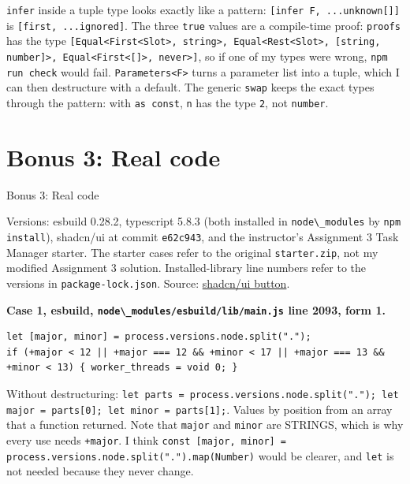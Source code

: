 \passthrough{\lstinline!infer!} inside a tuple type looks exactly like a pattern: \passthrough{\lstinline![infer F, ...unknown[]]!} is \passthrough{\lstinline![first, ...ignored]!}. The three \passthrough{\lstinline!true!} values
are a compile-time proof: \passthrough{\lstinline!proofs!} has the type \passthrough{\lstinline![Equal<First<Slot>, string>, Equal<Rest<Slot>, [string, number]>, Equal<First<[]>, never>]!},
so if one of my types were wrong, \passthrough{\lstinline!npm run check!} would fail. \passthrough{\lstinline!Parameters<F>!} turns a parameter list into a tuple, which I can then
destructure with a default. The generic \passthrough{\lstinline!swap!} keeps the exact types through the pattern: with \passthrough{\lstinline!as const!}, \passthrough{\lstinline!n!} has the type \passthrough{\lstinline!2!}, not \passthrough{\lstinline!number!}.

\section{Bonus 3: Real code}\label{bonus-3-real-code}

Bonus 3: Real code

Versions: esbuild 0.28.2, typescript 5.8.3 (both installed in \passthrough{\lstinline!node\_modules!} by \passthrough{\lstinline!npm install!}),
shadcn/ui at commit \passthrough{\lstinline!e62c943!}, and the instructor's Assignment 3 Task Manager starter.
The starter cases refer to the original \passthrough{\lstinline!starter.zip!}, not my modified Assignment 3 solution.
Installed-library line numbers refer to the versions in \passthrough{\lstinline!package-lock.json!}.
Source: \href{https://github.com/shadcn-ui/ui/blob/e62c943/apps/v4/registry/new-york-v4/ui/button.tsx\#L40}{shadcn/ui button}.

\textbf{Case 1, esbuild, \passthrough{\lstinline!node\_modules/esbuild/lib/main.js!} line 2093, form 1.}

\begin{lstlisting}
let [major, minor] = process.versions.node.split(".");
if (+major < 12 || +major === 12 && +minor < 17 || +major === 13 && +minor < 13) { worker_threads = void 0; }
\end{lstlisting}

Without destructuring: \passthrough{\lstinline!let parts = process.versions.node.split("."); let major = parts[0]; let minor = parts[1];!}.
Values by position from an array that a function returned. Note that \passthrough{\lstinline!major!} and \passthrough{\lstinline!minor!} are STRINGS, which is why every use needs \passthrough{\lstinline!+major!}.
I think \passthrough{\lstinline!const [major, minor] = process.versions.node.split(".").map(Number)!} would be clearer, and \passthrough{\lstinline!let!} is not needed because they never change.

